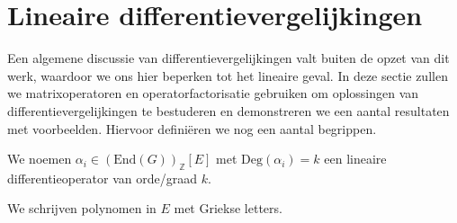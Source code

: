 \documentclass[a4paper,12pt]{article}
\begin{document}


\section{Lineaire differentievergelijkingen}
Een algemene discussie van differentievergelijkingen valt buiten de opzet van dit werk, waardoor we ons hier beperken tot het lineaire geval.
In deze sectie zullen we matrixoperatoren en operatorfactorisatie gebruiken om oplossingen van
differentievergelijkingen te bestuderen en demonstreren we een aantal resultaten met voorbeelden.
Hiervoor definiëren we nog een aantal begrippen.

\begin{definition}
    We noemen $\alpha_i\in (\text{End}(G))_\mathbb{Z}[E]$ met $\text{Deg}(\alpha_i)=k$
    een lineaire differentieoperator van orde/graad $k$.
\end{definition}

\begin{notation}[polynomen in $E$]
    We schrijven polynomen in $E$ met Griekse letters.
\end{notation}
\end{document}
